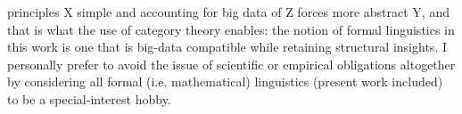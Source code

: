 principles X simple and accounting for big data of Z forces more abstract Y, and that is what the use of category theory enables: the notion of formal linguistics in this work is one that is big-data compatible while retaining structural insights. I personally prefer to avoid the issue of scientific or empirical obligations altogether by considering all formal (i.e. mathematical) linguistics (present work included) to be a special-interest hobby.
